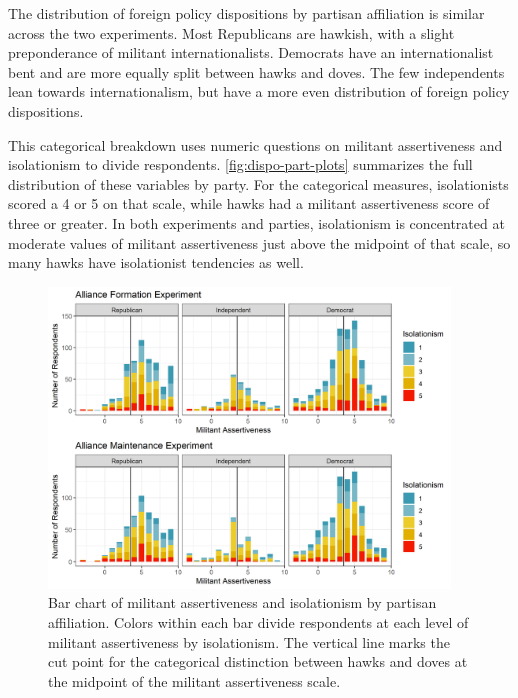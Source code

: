 \documentclass[12pt]{article}
\begin{document}
The distribution of foreign policy dispositions by partisan affiliation is similar across the two experiments. 
Most Republicans are hawkish, with a slight preponderance of militant internationalists. 
Democrats have an internationalist bent and are more equally split between hawks and doves. 
The few independents lean towards internationalism, but have a more even distribution of foreign policy dispositions. 


This categorical breakdown uses numeric questions on militant assertiveness and isolationism to divide respondents. 
\autoref{fig:dispo-part-plots} summarizes the full distribution of these variables by party. 
For the categorical measures, isolationists scored a 4 or 5 on that scale, while hawks had a militant assertiveness score of three or greater. 
In both experiments and parties, isolationism is concentrated at moderate values of militant assertiveness just above the midpoint of that scale, so many hawks have isolationist tendencies as well.    


\begin{figure}
	\centering
		\includegraphics[width=0.95\textwidth]{dispo-part-plots.png}
	\caption{Bar chart of militant assertiveness and isolationism by partisan affiliation. Colors within each bar divide respondents at each level of militant assertiveness by isolationism. The vertical line marks the cut point for the categorical distinction between hawks and doves at the midpoint of the militant assertiveness scale.}
	\label{fig:dispo-part-plots}
\end{figure}



\newpage
\end{document}
